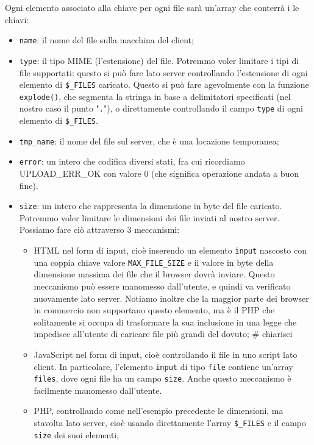\documentclass[a4paper,11pt]{article}
\begin{document}
Ogni elemento associato alla chiave per ogni file sarà un'array che conterrà i le chiavi:
\begin{itemize}
	\item \lstinline|name|: il nome del file sulla macchina del client;
	\item \lstinline|type|: il tipo MIME (l'estensione) del file.
		Potremmo voler limitare i tipi di file supportati: questo si può fare lato server controllando l'estensione di ogni elemento di \lstinline|$_FILES| caricato.
		Questo si può fare agevolmente con la funzione \lstinline|explode()|, che segmenta la stringa in base a delimitatori specificati (nel nostro caso il punto "\lstinline|.|"), o direttamente controllando il campo \lstinline|type| di ogni elemento di \lstinline|$_FILES|.
	\item \lstinline|tmp_name|: il nome del file sul server, che è una locazione temporanea;
	\item \lstinline|error|: un intero che codifica diversi stati, fra cui ricordiamo UPLOAD\_ERR\_OK con valore 0 (che significa operazione andata a buon fine).
	\item \lstinline|size|: un intero che rappresenta la dimensione in byte del file caricato. Potremmo voler limitare le dimensioni dei file inviati al nostro server. Possiamo fare ciò attraverso 3 meccanismi:
		\begin{itemize}
			\item HTML nel form di input, cioè inserendo un elemento \lstinline|input| nascosto con una coppia chiave valore \lstinline|MAX_FILE_SIZE| e il valore in byte della dimensione massima dei file che il browser dovrà inviare.
				Questo meccanismo può essere manomesso dall'utente, e quindi va verificato nuovamente lato server.
				Notiamo inoltre che la maggior parte dei browser in commercio non supportano questo elemento, ma è il PHP che solitamente si occupa di trasformare la sua inclusione in una legge che impedisce all'utente di caricare file più grandi del dovuto; # chiarisci
			\item JavaScript nel form di input, cioè controllando il file in uno script lato client. In particolare, l'elemento \lstinline|input| di tipo \lstinline|file| contiene un'array \lstinline|files|, dove ogni file ha un campo \lstinline|size|.
				Anche questo meccanismo è facilmente manomesso dall'utente.
			\item PHP,  controllando come nell'esempio precedente le dimensioni, ma stavolta lato server, cioè usando direttamente l'array \lstinline|$_FILES| e il campo \lstinline|size| dei suoi elementi, 
		\end{itemize}
\end{itemize}
\end{document}
